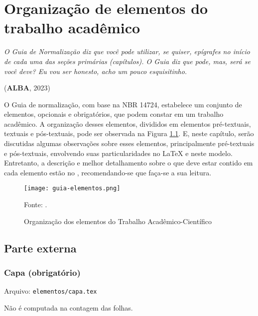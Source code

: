\chapter{Organização de elementos do trabalho acadêmico}
\begin{epigrafe}
    \textit{O Guia de Normalização diz que você pode utilizar, se quiser, epígrafes no início de cada uma das seções primárias (capítulos). O Guia diz que pode, mas, será se você deve? Eu vou ser honesto, acho um pouco esquisitinho.} 
    
    (\textbf{\MakeUppercase{Alba}}, 2023)
\end{epigrafe}

O Guia de normalização, com base na NBR 14724, estabelece um conjunto de elementos, opcionais e obrigatórios, que podem constar em um trabalho acadêmico. A organização desses elementos, divididos em elementos pré-textuais, textuais e pós-textuais, pode ser observada na Figura \ref{figura:elementos-guia}. E, neste capítulo, serão discutidas algumas observações sobre esses elementos, principalmente pré-textuais e pós-textuais, envolvendo suas particularidades no \LaTeX{} e neste modelo. Entretanto, a descrição e melhor detalhamento sobre o que deve estar contido em cada elemento estão no  \cite{livro:iffar-guia-normalizacao-2022}, recomendando-se que faça-se a sua leitura.

\begin{figure}[H]
    \Centering\singlespacing

    \caption{Organização dos elementos do Trabalho Acadêmico-Científico}
    \label{figura:elementos-guia}
    \texttt{[image: guia-elementos.png]}
    
    \footnotesize
    Fonte: \textcite{livro:iffar-guia-normalizacao-2022}.
  \end{figure}

\section{Parte externa}
    \subsection{Capa (obrigatório)}
    Arquivo: \texttt{elementos/capa.tex}

    Não é computada na contagem das folhas.


